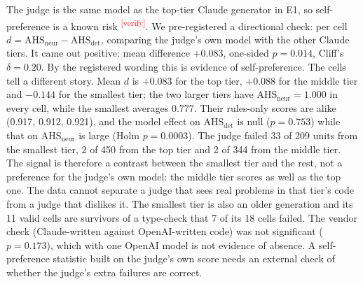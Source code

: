 \documentclass[10pt,a4paper]{article}
\newcommand{\citeneeded}[1]{\cite{#1}\textsuperscript{\textcolor{red}{\tiny[verify]}}}
\newcommand{\ahs}[1]{\mathrm{AHS}_{\mathrm{#1}}}
\begin{document}
The judge is the same model as the top-tier Claude generator in E1, so self-preference is a known risk
\citeneeded{panickssery2024self}. We pre-registered a directional check: per cell
$d = \ahs{neur} - \ahs{det}$, comparing the judge's own model with the other Claude tiers.
It came out positive: mean difference $+0.083$, one-sided $p = 0.014$, Cliff's $\delta = 0.20$.
By the registered wording this is evidence of self-preference. The cells tell a different story. Mean $d$ is
$+0.083$ for the top tier, $+0.088$ for the middle tier and $-0.144$ for the smallest tier; the two larger tiers
have $\ahs{neur} = 1.000$ in every cell, while the smallest averages 0.777. Their rules-only scores are alike
(0.917, 0.912, 0.921), and the model effect on $\ahs{det}$ is null ($p = 0.753$) while that on $\ahs{neur}$ is
large (Holm $p = 0.0003$).
The judge failed 33 of 209 units from the smallest tier, 2 of 450 from the top tier and 2 of 344 from the middle
tier. The signal is therefore a contrast between the smallest tier and the rest, not a preference for the judge's own
model: the middle tier scores as well as the top one.
The data cannot separate a judge that sees real problems in that tier's code from a judge that dislikes it. The
smallest tier is also an older generation and its 11 valid cells are survivors of a type-check that 7 of its 18
cells failed. The vendor check (Claude-written against OpenAI-written code) was not significant ($p = 0.173$),
which with one OpenAI model is not evidence of absence.
A self-preference statistic built on the judge's own score needs an external check of whether the judge's
extra failures are correct.
\end{document}
